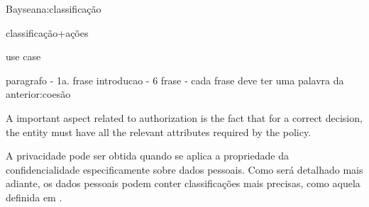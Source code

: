 Bayseana:classificação

classificação+ações

use case

paragrafo
- 1a. frase introducao
- 6 frase
- cada frase deve ter uma palavra da anterior:coesão


A important aspect related to authorization is the fact that for a correct decision, the entity must have all the relevant attributes required by the policy.

A privacidade pode ser obtida quando se aplica a propriedade da confidencialidade especificamente sobre dados pessoais. Como será detalhado mais adiante, os dados pessoais podem conter classificações mais precisas, como aquela definida em \cite{heurix2015taxonomy}.
